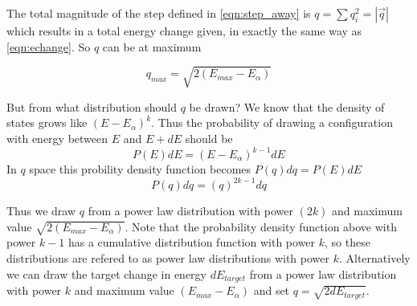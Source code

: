 \documentclass[a4paper]{article}
\begin{document}
The total magnitude of the step defined in \ref{eqn:step_away} is $q =
\sum{q_i^2} = |\vec{q}|$ which results in a total energy change given, in
exactly the same way as \ref{eqn:echange}.  So $q$ can be at maximum

\begin{equation}
  q_{max} = \sqrt{2 (E_{max} - E_{\alpha})}
\end{equation}


But from what distribution should $q$ be drawn?  
We know that the density of states grows like $(E-E_{\alpha})^k$.
Thus the probability of drawing a configuration with energy
between $E$ and $E+dE$ should be 
\begin{equation}
  P(E)dE = (E-E_{\alpha})^{k-1}dE
\end{equation}
In $q$ space this probility density function becomes $P(q)dq = P(E)dE$
\begin{equation}
  P(q)dq = (q)^{2k-1}dq
\end{equation}

Thus we draw $q$ from a power law distribution with power $(2k)$ and maximum
value $\sqrt{2 (E_{max} - E_{\alpha})}$.  Note that the probability density
function above with power $k-1$ has a cumulative distribution function with
power $k$, so these distributions are refered to as power law distributions
with power $k$.
Alternatively we can draw the target change in energy $dE_{target}$ from a power law
distribution with power $k$ and maximum value $(E_{max} - E_{\alpha})$
and set $q = \sqrt{2 dE_{target}}$.





\end{document}
